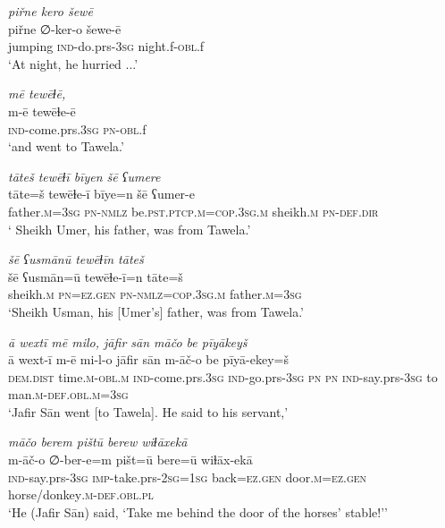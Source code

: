 \ea \label{ŠJ.55}
\textit{piřne kero šewē} \\ 
\gll piřne ∅-ker-o šewe-ē \\ 
 jumping \textsc{ind-}do.prs\textsc{-3sg} night.f\textsc{-obl}.f \\ 
\glt `At night, he hurried ...'
\z 
 
\ea \label{ŠJ.56}
\textit{mē tewēɫē,} \\ 
\gll m-ē tewēɫe-ē \\ 
 \textsc{ind-}come.prs\textsc{.3sg} \textsc{pn}\textsc{-obl}.f \\ 
\glt `and went to Tawela.'
\z 
 
\ea \label{ŠJ.57}
\textit{tāteš tewēɫī bīyen šē ʕumere} \\ 
\gll tāte=š tewēɫe-ī bīye=n šē ʕumer-e \\ 
 father\textsc{.m}\textsc{=3sg} \textsc{pn}\textsc{-nmlz} be\textsc{.pst}\textsc{.ptcp}\textsc{.m}\textsc{=cop}\textsc{.3sg}\textsc{.m} sheikh\textsc{.m} \textsc{pn}\textsc{-def}\textsc{.dir} \\ 
\glt ` Sheikh Umer, his father, was from Tawela.'
\z 
 
\ea \label{ŠJ.58}
\textit{šē ʕusmānū tewēɫīn tāteš} \\ 
\gll šē ʕusmān=ū tewēɫe-ī=n tāte=š \\ 
 sheikh\textsc{.m} \textsc{pn}\textsc{=ez.gen} \textsc{pn}\textsc{-nmlz}\textsc{=cop}\textsc{.3sg}\textsc{.m} father\textsc{.m}\textsc{=3sg} \\ 
\glt `Sheikh Usman, his [Umer’s] father, was from Tawela.'
\z 
 
\ea \label{ŠJ.59}
\textit{ā wextī mē milo, jāfir sān māčo be pīyākeyš} \\ 
\gll ā wext-ī m-ē mi-l-o jāfir sān m-āč-o be pīyā-ekey=š \\ 
 \textsc{dem.dist} time\textsc{.m}\textsc{-obl}\textsc{.m} \textsc{ind-}come.prs\textsc{.3sg} \textsc{ind-}go.prs\textsc{-3sg} \textsc{pn} \textsc{pn} \textsc{ind-}say.prs\textsc{-3sg} to man\textsc{.m}\textsc{-def}\textsc{.obl}\textsc{.m}\textsc{=3sg} \\ 
\glt `Jafir Sān went [to Tawela]. He said to his servant,'
\z 
 
\ea \label{ŠJ.62}
\textit{māčo berem pištū berew wiɫāxekā} \\ 
\gll m-āč-o ∅-ber-e=m pišt=ū bere=ū wiɫāx-ekā \\ 
 \textsc{ind-}say.prs\textsc{-3sg} \textsc{imp-}take.prs-\textsc{2sg}\textsc{=\textsc{1sg}} back\textsc{=ez.gen} door\textsc{.m}\textsc{=ez.gen} horse/donkey\textsc{.m}\textsc{-def}\textsc{.obl}\textsc{.pl} \\ 
\glt `He (Jafir Sān) said, ‘Take me behind the door of the horses’ stable!’'
\z 
 
